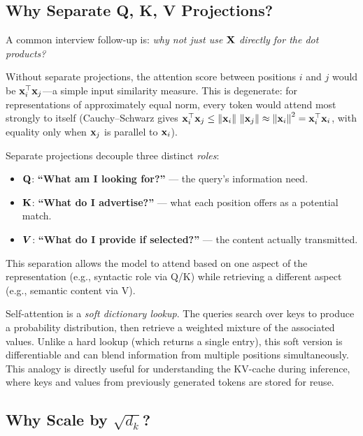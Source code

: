 \subsection{Why Separate Q, K, V Projections?}

A common interview follow-up is: \emph{why not just use $\mathbf{X}$ directly for the
dot products?}

Without separate projections, the attention score between positions $i$ and $j$
would be $\mathbf{x}_i^\top \mathbf{x}_j$---a simple input similarity measure.  This is
degenerate: for representations of approximately equal norm, every token
would attend most strongly to itself (Cauchy--Schwarz gives
$\mathbf{x}_i^\top \mathbf{x}_j \leq \left\lVert\mathbf{x}_i\right\rVert\,\left\lVert\mathbf{x}_j\right\rVert \approx \left\lVert\mathbf{x}_i\right\rVert^2
= \mathbf{x}_i^\top \mathbf{x}_i$, with equality only when $\mathbf{x}_j$ is parallel to
$\mathbf{x}_i$).

Separate projections decouple three distinct \emph{roles}:
\begin{itemize}
    \item $\mathbf{Q}$: \textbf{``What am I looking for?''} --- the query's
          information need.
    \item $\mathbf{K}$: \textbf{``What do I advertise?''} --- what each position
          offers as a potential match.
    \item $\bm{V}$: \textbf{``What do I provide if selected?''} --- the content
          actually transmitted.
\end{itemize}

This separation allows the model to attend based on one aspect of the
representation (e.g., syntactic role via Q/K) while retrieving a different
aspect (e.g., semantic content via V).

\begin{keyinsight}
Self-attention is a \emph{soft dictionary lookup}.  The queries search over
keys to produce a probability distribution, then retrieve a weighted mixture
of the associated values.  Unlike a hard lookup (which returns a single
entry), this soft version is differentiable and can blend information from
multiple positions simultaneously.  This analogy is directly useful for
understanding the KV-cache during inference, where keys and values from
previously generated tokens are stored for reuse.
\end{keyinsight}

\subsection{Why Scale by $\sqrt{d_k}$?}
\label{sec:sqrt-scaling}

